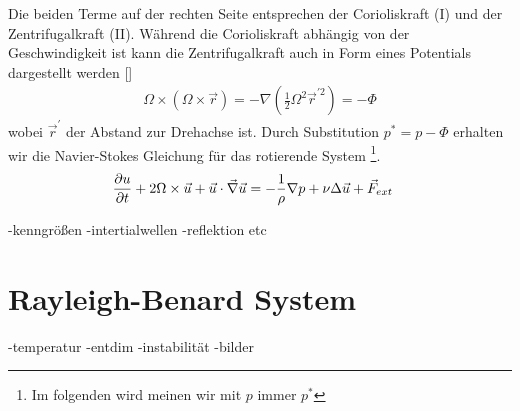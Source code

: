Die beiden Terme auf der rechten Seite entsprechen der Corioliskraft (I) und der Zentrifugalkraft (II). Während die Corioliskraft abhängig von der Geschwindigkeit ist
kann die Zentrifugalkraft auch in Form eines Potentials dargestellt werden []
\begin{align}
    \Omega \times (\Omega \times \vec{r}) = - \nabla(\frac{1}{2}\Omega^2\vec{r}^{'2}) = -\Phi
\end{align}
wobei $\vec{r}^'$ der Abstand zur Drehachse ist. Durch Substitution $p^* = p - \Phi$
erhalten wir die Navier-Stokes Gleichung für das rotierende System \footnote{Im folgenden wird meinen wir mit $p$ immer $p^*$ }.
\begin{align}
    \pdn[u]{t} + 2\Omega \times \vec{u} +  \vec{u} \cdot \vec{\nabla} \vec{u} &= - \frac{1}{\rho} \nabla p + \nu \Delta \vec{u} + \vec{F}_{ext}
\end{align}

-kenngrößen
-intertialwellen
-reflektion etc

\section{Rayleigh-Benard System}
-temperatur
-entdim
-instabilität
-bilder





